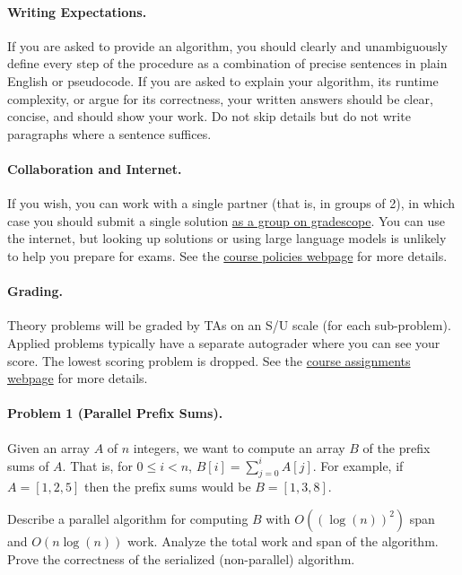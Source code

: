 \documentclass[11pt]{article}
\begin{document}
\paragraph{Writing Expectations.} If you are asked to provide an algorithm, you should clearly and unambiguously define every step of the procedure as a combination of precise sentences in plain English or pseudocode. If you are asked to explain your algorithm, its runtime complexity, or argue for its correctness, your written answers should be clear, concise, and should show your work. Do not skip details but do not write paragraphs where a sentence suffices.

\paragraph{Collaboration and Internet.} If you wish, you can work with a single partner (that is, in groups of 2), in which case you should submit a single solution \href{https://help.gradescope.com/article/m5qz2xsnjy-student-add-group-members}{as a group on gradescope}. You can use the internet, but looking up solutions or using large language models is unlikely to help you prepare for exams. See the \href{https://sites.duke.edu/spring24compsci330/policies/}{course policies webpage} for more details.

\paragraph{Grading.} Theory problems will be graded by TAs on an S/U scale (for each sub-problem). Applied problems typically have a separate autograder where you can see your score. The lowest scoring problem is dropped. See the \href{https://sites.duke.edu/spring24compsci330/assignments/}{course assignments webpage} for more details.


\newpage
\paragraph{Problem 1 (Parallel Prefix Sums).} Given an array $A$ of $n$ integers, we want to compute an array $B$ of the prefix sums of $A$. That is, for $0 \le i < n$, $B[i] = \sum_{j=0}^{i} A[j]$. For example, if $A = [1, 2, 5]$ then the prefix sums would be $B = [1, 3, 8]$.

Describe a parallel algorithm for computing $B$ with $O((\log(n))^2)$ span and $O(n \log(n))$ work. Analyze the total work and span of the algorithm. Prove the correctness of the serialized (non-parallel) algorithm.
\end{document}
